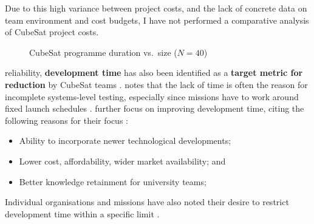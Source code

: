 \documentclass[a4paper,nobib,justified,final]{tufte-book}
\begin{document}
Due to this high variance between project costs, and the lack of concrete data on team environment and cost budgets, I have not performed a comparative analysis of CubeSat project costs.

\begin{figure}
	\center
	\caption[CubeSat programme duration vs.\space size]{CubeSat programme duration vs.~size (\( N = 40 \)) \cite{berthoudHowSetCubeSat2016}}
	\label{fig:l_cubesat_size_duration}
\end{figure}

 reliability, \textbf{development time} has also been identified as a \textbf{target metric for reduction} by CubeSat teams \autocite{honore-livermoreIntegratingAgileSystems2022}. \citeauthor{swartwoutUniversityClassSpacecraft2023} notes that the lack of time is often the reason for incomplete systems-level testing, especially since missions have to work around fixed launch schedules \cite{swartwoutUniversityClassSpacecraft2023}.  \citeauthor{pradhanShorteningDeliveryTime2020} further focus on improving development time, citing the following reasons for their focus \autocite{pradhanShorteningDeliveryTime2020}:
\begin{itemize}[itemsep=-2ex]
	\item Ability to incorporate newer technological developments;
	\item Lower cost, affordability, wider market availability; and
	\item Better knowledge retainment for university teams;
\end{itemize}
Individual organisations and missions have also noted their desire to restrict development time within a specific limit \cite{sousaCubeSatDevelopmentFramework2021,cheongRobustFrameworkLowCost2020,cappaertBuildingDeployingOperating2018}.
\end{document}
